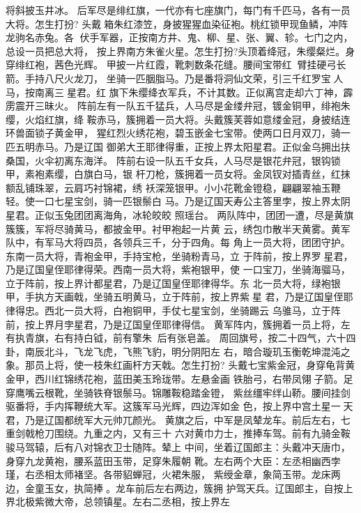 将斜披玉井冰。
后军尽是绯红旗，一代亦有七座旗门，每门有千匹马，各有一员大将。怎生打扮?
头戴箱朱红漆笠，身披猩猩血染征袍。桃红锁甲现鱼鳞，冲阵龙驹名赤兔。各
伏手军器，正按南方井、鬼、柳、星、张、翼、轸。七门之内，总设一员把总大将，
按上界南方朱雀火星。怎生打扮?头顶着绛冠，朱缨粲烂。身穿绯红袍，茜色光辉。
甲披一片红霞，靴刺数条花缝。腰间宝带红，臂挂硬弓长箭。手持八尺火龙刀，
坐骑一匹胭脂马。乃是番将洞仙文荣，引三千红罗宝人马，按南离三星君。红
旗下朱缨绛衣军兵，不计其数。正似离宫走却六丁神，霹雳震开三昧火。
阵前左有一队五千猛兵，人马尽是金缕弁冠，镀金铜甲，绯袍朱缨，火焰红旗，绛
鞍赤马，簇拥着一员大将。头戴簇芙蓉如意缕金冠，身披结连环兽面锁子黄金甲，
猩红烈火绣花袍，碧玉嵌金七宝带。使两口日月双刀，骑一匹五明赤马。乃是辽国
御弟大王耶律得重，正按上界太阳星君。正似金乌拥出扶桑国，火伞初离东海洋。
阵前右设一队五千女兵，人马尽是银花弁冠，银钩锁甲，素袍素缨，白旗白马，银
杆刀枪，簇拥着一员女将。金凤钗对插青丝，红抹额乱铺珠翠，云肩巧衬锦裙，绣
袄深笼银甲。小小花靴金镫稳，翩翩翠袖玉鞭轻。使一口七星宝剑，骑一匹银鬃白
马。乃是辽国天寿公主答里孛，按上界太阴星君。正似玉兔团团离海角，冰轮皎皎
照瑶台。
两队阵中，团团一遭，尽是黄旗簇簇，军将尽骑黄马，都披金甲。衬甲袍起一片黄
云，绣包巾散半天黄雾。黄军队中，有军马大将四员，各领兵三千，分于四角。每
角上一员大将，团团守护。东南一员大将，青袍金甲，手持宝枪，坐骑粉青马，立
于阵前，按上界罗星君，乃是辽国皇侄耶律得荣。西南一员大将，紫袍银甲，使
一口宝刀，坐骑海骝马，立于阵前，按上界计都星君，乃是辽国皇侄耶律得华。东
北一员大将，绿袍银甲，手执方天画戟，坐骑五明黄马，立于阵前，按上界紫星
君，乃是辽国皇侄耶律得忠。西北一员大将，白袍铜甲，手仗七星宝剑，坐骑踢云
乌骓马，立于阵前，按上界月孛星君，乃是辽国皇侄耶律得信。
黄军阵内，簇拥着一员上将，左有执青旗，右有持白钺，前有擎朱，后有张皂盖。
周回旗号，按二十四气，六十四卦，南辰北斗，飞龙飞虎，飞熊飞豹，明分阴阳左
右，暗合璇玑玉衡乾坤混沌之象。那员上将，使一枝朱红画杆方天戟。怎生打扮?
头戴七宝紫金冠，身穿龟背黄金甲，西川红锦绣花袍，蓝田美玉玲珑带。左悬金画
铁胎弓，右带凤翎子箭。足穿鹰嘴云根靴，坐骑铁脊银鬃马。锦雕鞍稳踏金镫，
紫丝缰牢绊山鞒。腰间挂剑驱番将，手内挥鞭统大军。这簇军马光辉，四边浑如金
色，按上界中宫土星一天君，乃是辽国都统军大元帅兀颜光。
黄旗之后，中军是凤辇龙车。前后左右，七重剑戟枪刀围绕。九重之内，又有三十
六对黄巾力士，推捧车驾。前有九骑金鞍骏马驾辕，后有八对锦衣卫士随阵。辇上
中间，坐着辽国郎主：头戴冲天唐巾，身穿九龙黄袍，腰系蓝田玉带，足穿朱履朝
靴。左右两个大臣：左丞相幽西孛瑾，右丞相太师褚坚。各带貂蝉冠，火裙朱服，
紫绶金章，象简玉带。龙床两边，金童玉女，执简捧。龙车前后左右两边，簇拥
护驾天兵。辽国郎主，自按上界北极紫微大帝，总领镇星。左右二丞相，按上界左
